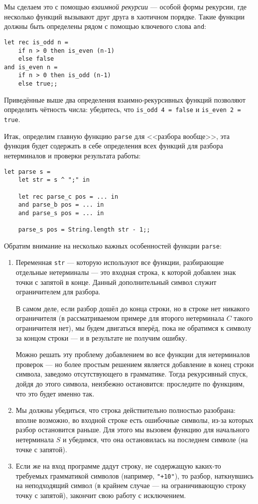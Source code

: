 \documentclass[12pt]{article}
\begin{document}
Мы сделаем это с помощью \emph{взаимной рекурсии} --- особой формы рекурсии, где
несколько функций вызывают друг друга в хаотичном порядке. Такие функции должны быть
определены рядом с помощью ключевого слова \verb!and!:

\begin{verbatim}
let rec is_odd n = 
    if n > 0 then is_even (n-1)
    else false
and is_even n =
    if n > 0 then is_odd (n-1)
    else true;;
\end{verbatim}

\noindent Приведённые выше два определения взаимно-рекурсивных функций позволяют определить чётность
числа: убедитесь, что \verb!is_odd 4 = false! и \verb!is_even 2 = true!.

Итак, определим главную функцию \verb!parse! для <<разбора вообще>>, эта функция будет содержать 
в себе определения всех функций для разбора нетерминалов и проверки результата работы:

\begin{verbatim}
let parse s =
    let str = s ^ ";" in

    let rec parse_c pos = ... in
    and parse_b pos = ... in
    and parse_s pos = ... in

    parse_s pos = String.length str - 1;;
\end{verbatim}

Обратим внимание на несколько важных особенностей функции \verb!parse!:
\begin{enumerate}
\item Переменная \verb!str! --- которую используют все функции, разбирающие
отдельные нетерминалы --- это входная строка, к которой добавлен знак точки с
запятой в конце. Данный дополнительный символ служит ограничителем для разбора.

В самом деле, если разбор дошёл до конца строки, но в строке нет никакого ограничителя
(в рассматриваемом примере для второго нетерминала $C$ такого ограничителя нет), 
мы будем двигаться вперёд, пока не обратимся к символу за концом строки --- 
и в результате не получим ошибку.

Можно решать эту проблему добавлением во все функции для нетерминалов проверок 
--- но более простым решением является добавление в конец строки символа, заведомо
отсутствующего в грамматике. Тогда рекурсивный спуск, дойдя до этого символа,
неизбежно остановится: проследите по функциям, что это будет именно так.

\item Мы должны убедиться, что строка действительно полностью разобрана: вполне
возможно, во входной строке есть ошибочные символы, из-за которых разбор остановится
раньше. Для этого мы вызовем функцию для начального нетерминала $S$ и убедимся, что
она остановилась на последнем символе (на точке с запятой). 

\item Если же на вход программе дадут строку, не содержащую каких-то требуемых
грамматикой символов (например, \verb!"+10"!), то разбор, наткнувшись на неподходящий
символ (в крайнем случае --- на ограничивающую строку точку с запятой), закончит
свою работу с исключением.
\end{enumerate}

%
\end{document}
